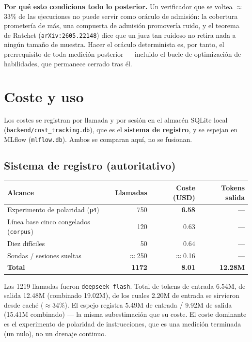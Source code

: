 \documentclass[11pt,a4paper]{article}
\begin{document}
\begin{notebox}[colframe=warn]
\textbf{Por qué esto condiciona todo lo posterior.} Un verificador que se voltea
$\approx$33\% de las ejecuciones no puede servir como oráculo de admisión: la
cobertura prometería de más, una compuerta de admisión promovería ruido, y el teorema
de Ratchet (\texttt{arXiv:2605.22148}) dice que un juez tan ruidoso no retira nada a
ningún tamaño de muestra. Hacer el oráculo determinista es, por tanto, el prerrequisito
de toda medición posterior --- incluido el bucle de optimización de habilidades, que
permanece cerrado tras él.
\end{notebox}

\section{Coste y uso}
\label{sec:cost}

Los costes se registran por llamada y por sesión en el almacén SQLite local
(\texttt{backend/cost\_tracking.db}), que es el \textbf{sistema de registro}, y se
espejan en MLflow (\texttt{mlflow.db}). Ambos se comparan aquí, no se fusionan.

\subsection{Sistema de registro (autoritativo)}

\begin{center}
\begin{tabular}{@{}lrrr@{}}
\toprule
\textbf{Alcance} & \textbf{Llamadas} & \textbf{Coste (USD)} & \textbf{Tokens salida} \\
\midrule
Experimento de polaridad (\texttt{p4}) & 750 & \textbf{6.58} & --- \\
Línea base cinco congelados (\texttt{corpus}) & 120 & 0.63 & --- \\
Diez difíciles & 50 & 0.64 & --- \\
Sondas / sesiones sueltas & $\approx$250 & $\approx$0.16 & --- \\
\midrule
\textbf{Total} & \textbf{1172} & \textbf{8.01} & \textbf{12.28M} \\
\bottomrule
\end{tabular}
\end{center}

Las 1219 llamadas fueron \texttt{deepseek-flash}. Total de tokens de entrada 6.54M,
de salida 12.48M (combinado 19.02M), de los cuales 2.20M de entrada se sirvieron desde
caché ($\approx$34\%). El espejo registra 5.49M de entrada / 9.92M de salida (15.41M
combinado) --- la misma subestimación que su coste. El coste dominante es el
experimento de polaridad de instrucciones, que es una medición terminada (un nulo), no
un drenaje continuo.
\end{document}

